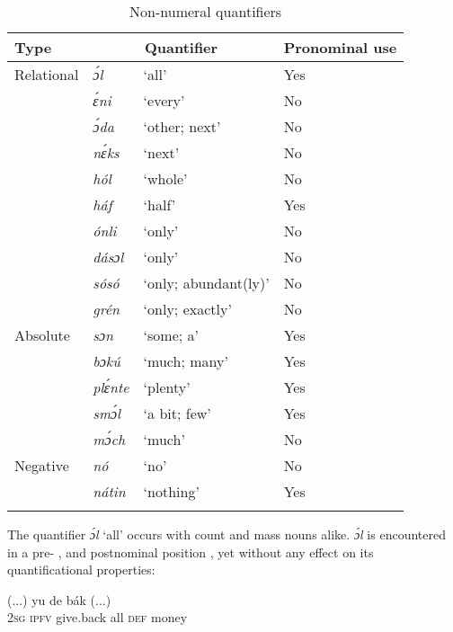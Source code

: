 \begin{table}
\caption{Non-numeral quantifiers}
\label{tab:key:5.5}

\begin{tabularx}{\textwidth}{XXll}
\lsptoprule

Type & \multicolumn{2}{c}{Quantifier} & Pronominal use\\
\midrule
Relational & \itshape ɔ́l & ‘all’ & Yes\\
& \itshape ɛ́ni & ‘every’ & No\\
& \itshape ɔ́da & ‘other; next’ & No\\
& \itshape nɛ́ks & ‘next’ & No\\
& \itshape hól & ‘whole’ & No\\
& \itshape háf & ‘half’ & Yes\\
& \itshape ónli & ‘only’ & No\\
& \itshape dásɔl & ‘only’ & No\\
& \itshape sósó & ‘only; abundant(ly)’ & No\\
& \itshape grén & ‘only; exactly’ & No\\

\tablevspace
Absolute & \itshape sɔn & ‘some; a’ & Yes\\
& \itshape bɔkú & ‘much; many’ & Yes\\
& \itshape plɛ́nte & ‘plenty’ & Yes\\
& \itshape smɔ́l & ‘a bit; few’ & Yes\\
& \itshape mɔ́ch & ‘much’ & No\\

\tablevspace
Negative & \itshape nó & ‘no’ & No\\
& \itshape nátin & ‘nothing’ & Yes\\
\lspbottomrule
\end{tabularx}
\end{table}
The quantifier \textit{ɔ́l} ‘all’\textit{} occurs with count and mass nouns alike. \textit{ɔ́l} is encountered in a pre- , and postnominal position , yet without any effect on its quantificational properties:


\ea%
    \label{ex:key:259}
    \gll (...)  yu  de  bák        (...)\\
 {} \textsc{2sg}  \textsc{ipfv}  give.back  all  \textsc{def}  money\\

